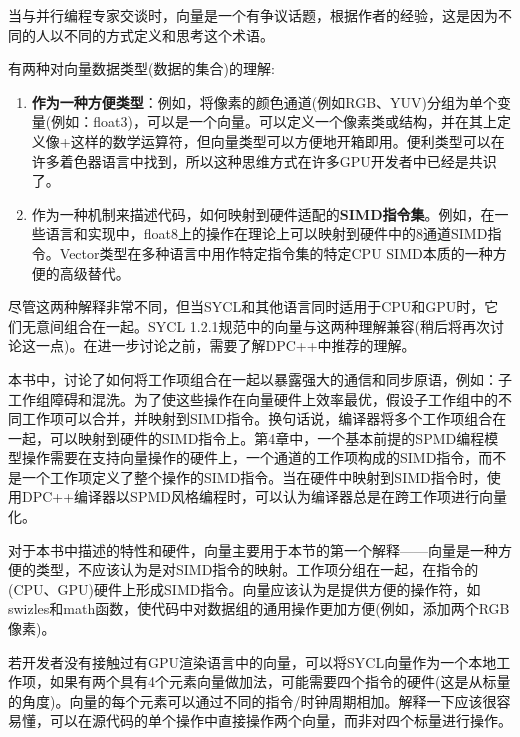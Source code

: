 当与并行编程专家交谈时，向量是一个有争议话题，根据作者的经验，这是因为不同的人以不同的方式定义和思考这个术语。\par

有两种对向量数据类型(数据的集合)的理解:\par

\begin{enumerate}
	\item \textbf{作为一种方便类型}：例如，将像素的颜色通道(例如RGB、YUV)分组为单个变量(例如：float3)，可以是一个向量。可以定义一个像素类或结构，并在其上定义像+这样的数学运算符，但向量类型可以方便地开箱即用。便利类型可以在许多着色器语言中找到，所以这种思维方式在许多GPU开发者中已经是共识了。
	\item 作为一种机制来描述代码，如何映射到硬件适配的\textbf{SIMD指令集}。例如，在一些语言和实现中，float8上的操作在理论上可以映射到硬件中的8通道SIMD指令。Vector类型在多种语言中用作特定指令集的特定CPU SIMD本质的一种方便的高级替代。
\end{enumerate}

尽管这两种解释非常不同，但当SYCL和其他语言同时适用于CPU和GPU时，它们无意间组合在一起。SYCL 1.2.1规范中的向量与这两种理解兼容(稍后将再次讨论这一点)。在进一步讨论之前，需要了解DPC++中推荐的理解。\par

本书中，讨论了如何将工作项组合在一起以暴露强大的通信和同步原语，例如：子工作组障碍和混洗。为了使这些操作在向量硬件上效率最优，假设子工作组中的不同工作项可以合并，并映射到SIMD指令。换句话说，编译器将多个工作项组合在一起，可以映射到硬件的SIMD指令上。第4章中，一个基本前提的SPMD编程模型操作需要在支持向量操作的硬件上，一个通道的工作项构成的SIMD指令，而不是一个工作项定义了整个操作的SIMD指令。当在硬件中映射到SIMD指令时，使用DPC++编译器以SPMD风格编程时，可以认为编译器总是在跨工作项进行向量化。\par

对于本书中描述的特性和硬件，向量主要用于本节的第一个解释——向量是一种方便的类型，不应该认为是对SIMD指令的映射。工作项分组在一起，在指令的(CPU、GPU)硬件上形成SIMD指令。向量应该认为是提供方便的操作符，如swizles和math函数，使代码中对数据组的通用操作更加方便(例如，添加两个RGB像素)。\par

若开发者没有接触过有GPU渲染语言中的向量，可以将SYCL向量作为一个本地工作项，如果有两个具有4个元素向量做加法，可能需要四个指令的硬件(这是从标量的角度)。向量的每个元素可以通过不同的指令/时钟周期相加。解释一下应该很容易懂，可以在源代码的单个操作中直接操作两个向量，而非对四个标量进行操作。\par

